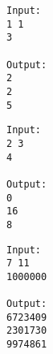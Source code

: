 \begin{verbatim}
Input:
1 1
3

Output:
2
2
5
\end{verbatim}
\begin{verbatim}
Input:
2 3
4

Output:
0
16
8
\end{verbatim}
\begin{verbatim}
Input:
7 11
1000000

Output:
6723409
2301730
9974861
\end{verbatim}